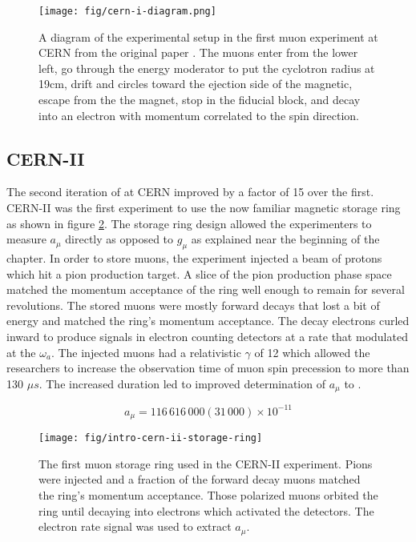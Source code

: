 \begin{figure}
\centering
\texttt{[image: fig/cern-i-diagram.png]}
\caption{A diagram of the experimental setup in the first muon \gmtwo experiment at CERN from the original paper \cite{cern-i}. The muons enter from the lower left, go through the energy moderator to put the cyclotron radius at 19cm, drift and circles toward the ejection side of the magnetic, escape from the the magnet, stop in the fiducial block, and decay into an electron with momentum correlated to the spin direction. \label{fig:cern-i-diagram}}
\end{figure}

\subsection{CERN-II}
The second iteration of \mugmtwo at CERN improved by a factor of 15 over the first.  CERN-II was the first \mugmtwo experiment to use the now familiar magnetic storage ring as shown in figure \ref{fig:intro-cern-ii-storage-ring}.  The storage ring design allowed the experimenters to measure $a_\mu$ directly as opposed to $g_\mu$ as explained near the beginning of the chapter. In order to store muons, the experiment injected a beam of protons which hit a pion production target.  A slice of the pion production phase space matched the momentum acceptance of the ring well enough to remain for several revolutions. The stored muons were mostly forward decays that lost a bit of energy and matched the ring's momentum acceptance.  The decay electrons curled inward to produce signals in electron counting detectors at a rate that modulated at the $\omega_a$.  The injected muons had a relativistic $\gamma$ of 12 which allowed the researchers to increase the observation time of muon spin precession to more than 130 $\mu s$.  The increased duration led to improved determination of $a_\mu$ to  \cite{47y-muon-g-2}.

\begin{equation}
\label{eqn:cern-ii-results}
a_\mu = 116\,616\,000 (31\,000) \times 10^{-11}
\end{equation}

\begin{figure}
\centering
\texttt{[image: fig/intro-cern-ii-storage-ring]}
\caption{
    The first muon storage ring used in the CERN-II experiment.  Pions were injected and a fraction of the forward decay muons matched the ring's momentum acceptance.  Those polarized muons orbited the ring until decaying into electrons which activated the detectors.  The electron rate signal was used to extract $a_\mu$.
    \label{fig:intro-cern-ii-storage-ring}    
}
\end{figure}

